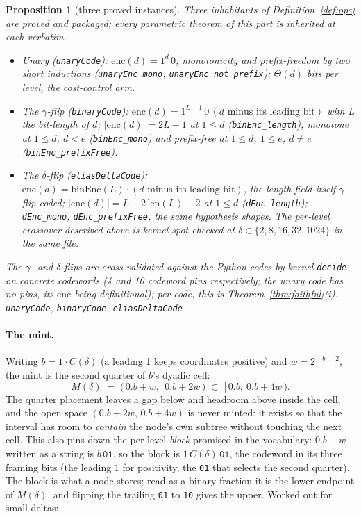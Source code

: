 \documentclass[11pt]{article}
\newtheorem{proposition}[theorem]{Proposition}
\newcommand{\lean}[1]{\texttt{#1}}
\newcommand{\code}[1]{\texttt{#1}}
\begin{document}
\begin{proposition}[three proved instances]
\label{prop:instances}
Three inhabitants of Definition~\ref{def:opc} are proved and
packaged; every parametric theorem of this part is inherited at each
verbatim.
\begin{itemize}[leftmargin=2em]
\item \emph{Unary} (\lean{unaryCode}): $\mathrm{enc}(d) =
  1^{d}\,0$; monotonicity and prefix-freedom by two short inductions
  (\lean{unaryEnc\_mono}, \lean{unaryEnc\_not\_prefix}); $\Theta(d)$
  bits per level, the cost-control arm.
\item \emph{The $\gamma$-flip} (\lean{binaryCode}): $\mathrm{enc}(d)
  = 1^{L-1}\,0\,(d \text{ minus its leading bit})$ with $L$ the
  bit-length of $d$; $|\mathrm{enc}(d)| = 2L - 1$ at $1 \le d$
  (\lean{binEnc\_length}); monotone at $1 \le d$, $d < e$
  (\lean{binEnc\_mono}) and prefix-free at $1 \le d$, $1 \le e$,
  $d \ne e$ (\lean{binEnc\_prefixFree}).
\item \emph{The $\delta$-flip} (\lean{eliasDeltaCode}):
  $\mathrm{enc}(d) = \mathrm{binEnc}(L) \cdot (d \text{ minus its
  leading bit})$, the length field itself $\gamma$-flip-coded;
  $|\mathrm{enc}(d)| = L + 2\,\mathrm{len}(L) - 2$ at $1 \le d$
  (\lean{dEnc\_length}); \lean{dEnc\_mono},
  \lean{dEnc\_prefixFree}, the same hypothesis shapes. The per-level
  crossover described above is kernel spot-checked at
  $\delta \in \{2, 8, 16, 32, 1024\}$ in the same file.
\end{itemize}
The $\gamma$- and $\delta$-flips are cross-validated against the
Python codes by kernel \code{decide} on concrete codewords (4 and 10
codeword pins respectively; the unary code has no pins, its
$\mathrm{enc}$ being definitional); per code, this is
Theorem~\ref{thm:faithful}(i).
\hfill\lean{unaryCode}, \lean{binaryCode}, \lean{eliasDeltaCode}
\end{proposition}

\paragraph{The mint.} Writing $b = 1 \cdot C(\delta)$ (a leading 1
keeps coordinates positive) and $w = 2^{-|b|-2}$, the mint is the
second quarter of $b$'s dyadic cell:
\[
  M(\delta) \;=\; \bigl(\,0.b + w,\ \ 0.b + 2w\,\bigr)
  \;\subset\; \bigl[\,0.b,\ 0.b + 4w\,\bigr) .
\]
The quarter placement leaves a gap below and headroom above inside the
cell, and the open space $(0.b+2w,\, 0.b+4w)$ is never minted: it
exists so that the interval has room to \emph{contain} the node's own
subtree without touching the next cell. This also pins down the
per-level \emph{block} promised in the vocabulary: $0.b + w$ written
as a string is $b\,\code{01}$, so the block is
$1\,C(\delta)\,\code{01}$, the codeword in its three framing bits
(the leading $1$ for positivity, the \code{01} that selects the
second quarter). The block is what a node stores; read as a binary
fraction it is the lower endpoint of $M(\delta)$, and flipping the
trailing \code{01} to \code{10} gives the upper. Worked out for
small deltas:
\end{document}
